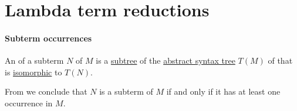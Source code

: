 \section{Lambda term reductions}\label{sec:lambda_term_reductions}

\paragraph{Subterm occurrences}

\begin{definition}\label{def:lambda_subterm_occurrence}\mimprovised
  An  of a subterm \( N \) of \( M \) is a \hyperref[def:tree/subtree]{subtree} of the \hyperref[con:abstract_syntax_tree]{abstract syntax tree} \( T(M) \) of that is \hyperref[def:labeled_tree/homomorphism]{isomorphic} to \( T(N) \).
\end{definition}
\begin{comments}
  \item From  we conclude that \( N \) is a subterm of \( M \) if and only if it has at least one occurrence in \( M \).
\end{comments}

